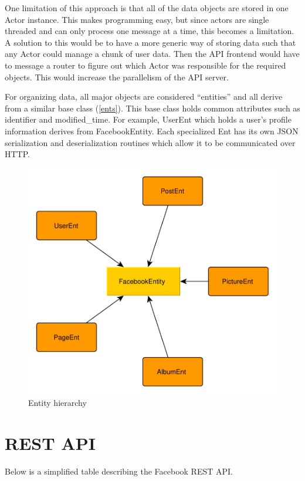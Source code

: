 \documentclass{article}
\begin{document}
One limitation of this approach is that all of the data objects are stored in one Actor instance. This makes programming easy, but since actors are single threaded and can only process one message at a time, this becomes a limitation. A solution to this would be to have a more generic way of storing data such that any Actor could manage a chunk of user data. Then the API frontend would have to message a router to figure out which Actor was responsible for the required objects. This would increase the parallelism of the API server.

For organizing data, all major objects are considered ``entities'' and all derive from a similar base class (\autoref{ents}). This base class holds common attributes such as identifier and modified\_time. For example, UserEnt which holds a user's profile information derives from FacebookEntity. Each specialized Ent has its own JSON serialization and deserialization routines which allow it to be communicated over HTTP.

\begin{figure}[H]
  \centering
  \includegraphics[scale=0.5]{diagrams/entity-hierarchy.pdf}
  \caption{Entity hierarchy}
  \label{ents}
\end{figure}

\section*{REST API}
Below is a simplified table describing the Facebook REST API.
\end{document}
